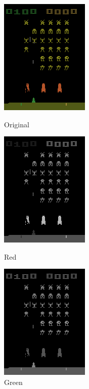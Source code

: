 
\begin{figure}[h!]
\centering
\captionsetup{justification=centering}
\begin{multicols}{4}
    \includegraphics[scale=0.7]{figures/methods/separating_colour_spaces_original.png}
    \caption{Original}\par
    \includegraphics[scale=0.7]{figures/methods/separating_colour_spaces_r.png}
    \caption{Red}\par
    \includegraphics[scale=0.7]{figures/methods/separating_colour_spaces_g.png}
    \caption{Green}\par

\end{multicols}
\end{figure}
